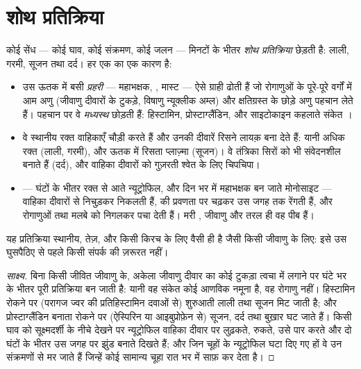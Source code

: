 \section{शोथ प्रतिक्रिया}

\begin{proposition}[वे चार चिह्न और उन्हें बनाने वाली चीज़ें]\label{prop:g12:innate-immunity:inflammation}
कोई सेंध --- कोई घाव, कोई संक्रमण, कोई जलन --- मिनटों के भीतर
\emph{शोथ प्रतिक्रिया} छेड़ती है: लाली, गरमी, सूजन तथा दर्द। हर
एक का एक कारण है:
\begin{itemize}
  \item उस ऊतक में बसी \emph{प्रहरी } --- महाभक्षक, , मास्ट  --- ऐसे ग्राही ढोती हैं जो रोगाणुओं के
        पूरे-पूरे वर्गों में आम अणु (जीवाणु दीवारों के टुकड़े, विषाणु
        न्यूक्लीक अम्ल) और क्षतिग्रस्त  के छोड़े अणु पहचान लेते
        हैं। पहचान पर वे \emph{मध्यस्थ} छोड़ती हैं:
        हिस्टामिन, प्रोस्टाग्लैंडिन, और साइटोकाइन कहलाते संकेत ।
  \item वे  स्थानीय रक्त वाहिकाएँ चौड़ी करते हैं और उनकी दीवारें
        रिसने लायक़ बना देते हैं: यानी अधिक रक्त (लाली, गरमी), और ऊतक में
        रिसता प्लाज़्मा (सूजन)। वे तंत्रिका सिरों को भी संवेदनशील बनाते
        हैं (दर्द), और वाहिका दीवारों को गुज़रती श्वेत  के लिए
        चिपचिपा।
  \item \emph{} --- घंटों के भीतर रक्त से आते न्यूट्रोफिल, और
        दिन भर में महाभक्षक बन जाते मोनोसाइट --- वाहिका दीवारों से निचुड़कर
        निकलती हैं,  की प्रवणता पर चढ़कर उस जगह तक रेंगती हैं, और
        रोगाणुओं तथा मलबे को निगलकर पचा देती हैं। मरी , जीवाणु
        और तरल ही वह पीब हैं।
\end{itemize}
यह प्रतिक्रिया स्थानीय, तेज़, और किसी किरच के लिए वैसी ही है जैसी किसी जीवाणु
के लिए: इसे उस घुसपैठिए से पहले किसी संपर्क की ज़रूरत नहीं।
\end{proposition}
\begin{proof}[साक्ष्य]
बिना किसी जीवित जीवाणु के, अकेला जीवाणु दीवार का कोई टुकड़ा त्वचा में लगाने
पर घंटे भर के भीतर पूरी प्रतिक्रिया बन जाती है: यानी वह संकेत कोई आणविक
नमूना है, वह रोगाणु नहीं। हिस्टामिन रोकने पर (परागज ज्वर की
प्रतिहिस्टामिन दवाओं से) शुरुआती लाली तथा सूजन मिट जाती है; और
प्रोस्टाग्लैंडिन बनाता  रोकने पर (ऐस्पिरिन या आइबुप्रोफ़ेन से) सूजन,
दर्द तथा बुख़ार घट जाते हैं। किसी घाव को सूक्ष्मदर्शी के नीचे देखने पर
न्यूट्रोफिल वाहिका दीवार पर लुढ़कते, रुकते, उसे पार करते और दो घंटों के भीतर
उस जगह पर झुंड बनाते दिखते हैं; और जिन चूहों के न्यूट्रोफिल घटा दिए गए हों
वे उन संक्रमणों से मर जाते हैं जिन्हें कोई सामान्य चूहा रात भर में साफ़ कर
देता है।
\end{proof}

